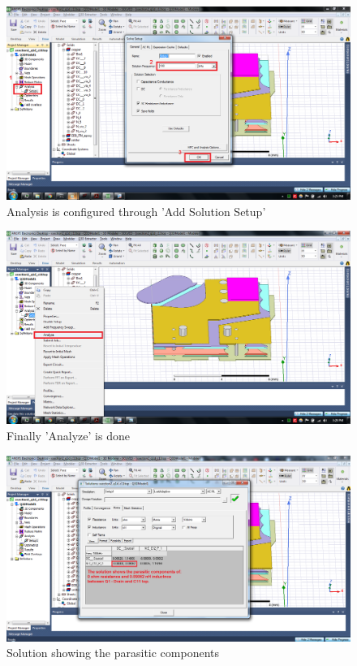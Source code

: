 \begin{enumerate}
\begin{figure} [H]
  \centering
  \includegraphics[width=\linewidth]{pictures/examples/setup.png}
  \caption{Analysis is configured through 'Add Solution Setup'}
  \label{fig:setup}
\end{figure}

\begin{figure} [H]
  \centering
  \includegraphics[width=\linewidth]{pictures/examples/analysis.png}
  \caption{Finally 'Analyze' is done}
  \label{fig:setup}
\end{figure}

\begin{figure} [H]
  \centering
  \includegraphics[width=\linewidth]{pictures/examples/results.png}
  \caption{Solution showing the parasitic components}
  \label{fig:results}
\end{figure}


\end{enumerate}
